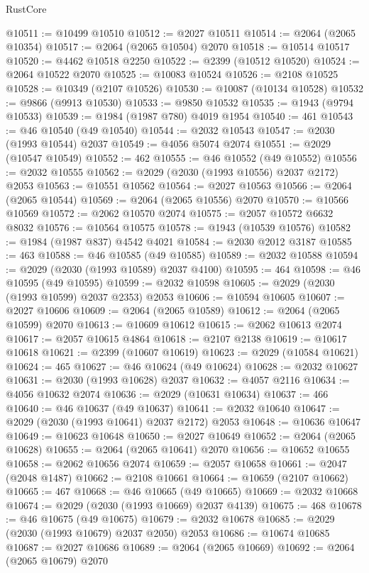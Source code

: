 \begin{lexlean}{RustCore}
\begin{coremodule}
@10511 := @10499 @10510
@10512 := @2027 @10511
@10514 := @2064 (@2065 @10354)
@10517 := @2064 (@2065 @10504) @2070
@10518 := @10514 @10517
@10520 := @4462 @10518 @2250
@10522 := @2399 (@10512 @10520)
@10524 := @2064 @10522 @2070
@10525 := @10083 @10524
@10526 := @2108 @10525
@10528 := @10349 (@2107 @10526)
@10530 := @10087 (@10134 @10528)
@10532 := @9866 (@9913 @10530)
@10533 := @9850 @10532
@10535 := @1943 (@9794 @10533)
@10539 := @1984 (@1987 @780) @4019 @1954
@10540 := 461
@10543 := @46 @10540 (@49 @10540)
@10544 := @2032 @10543
@10547 := @2030 (@1993 @10544) @2037
@10549 := @4056 @5074 @2074
@10551 := @2029 (@10547 @10549)
@10552 := 462
@10555 := @46 @10552 (@49 @10552)
@10556 := @2032 @10555
@10562 := @2029 (@2030 (@1993 @10556) @2037 @2172) @2053
@10563 := @10551 @10562
@10564 := @2027 @10563
@10566 := @2064 (@2065 @10544)
@10569 := @2064 (@2065 @10556) @2070
@10570 := @10566 @10569
@10572 := @2062 @10570 @2074
@10575 := @2057 @10572 @6632 @8032
@10576 := @10564 @10575
@10578 := @1943 (@10539 @10576)
@10582 := @1984 (@1987 @837) @4542 @4021
@10584 := @2030 @2012 @3187
@10585 := 463
@10588 := @46 @10585 (@49 @10585)
@10589 := @2032 @10588
@10594 := @2029 (@2030 (@1993 @10589) @2037 @4100)
@10595 := 464
@10598 := @46 @10595 (@49 @10595)
@10599 := @2032 @10598
@10605 := @2029 (@2030 (@1993 @10599) @2037 @2353) @2053
@10606 := @10594 @10605
@10607 := @2027 @10606
@10609 := @2064 (@2065 @10589)
@10612 := @2064 (@2065 @10599) @2070
@10613 := @10609 @10612
@10615 := @2062 @10613 @2074
@10617 := @2057 @10615 @4864
@10618 := @2107 @2138
@10619 := @10617 @10618
@10621 := @2399 (@10607 @10619)
@10623 := @2029 (@10584 @10621)
@10624 := 465
@10627 := @46 @10624 (@49 @10624)
@10628 := @2032 @10627
@10631 := @2030 (@1993 @10628) @2037
@10632 := @4057 @2116
@10634 := @4056 @10632 @2074
@10636 := @2029 (@10631 @10634)
@10637 := 466
@10640 := @46 @10637 (@49 @10637)
@10641 := @2032 @10640
@10647 := @2029 (@2030 (@1993 @10641) @2037 @2172) @2053
@10648 := @10636 @10647
@10649 := @10623 @10648
@10650 := @2027 @10649
@10652 := @2064 (@2065 @10628)
@10655 := @2064 (@2065 @10641) @2070
@10656 := @10652 @10655
@10658 := @2062 @10656 @2074
@10659 := @2057 @10658
@10661 := @2047 (@2048 @1487)
@10662 := @2108 @10661
@10664 := @10659 (@2107 @10662)
@10665 := 467
@10668 := @46 @10665 (@49 @10665)
@10669 := @2032 @10668
@10674 := @2029 (@2030 (@1993 @10669) @2037 @4139)
@10675 := 468
@10678 := @46 @10675 (@49 @10675)
@10679 := @2032 @10678
@10685 := @2029 (@2030 (@1993 @10679) @2037 @2050) @2053
@10686 := @10674 @10685
@10687 := @2027 @10686
@10689 := @2064 (@2065 @10669)
@10692 := @2064 (@2065 @10679) @2070

\end{coremodule}
\end{lexlean}

